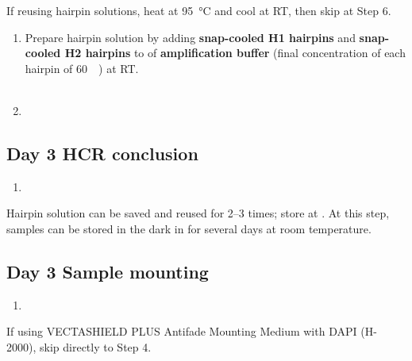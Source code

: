 \documentclass[10pt]{report}
\begin{document}
\bigskip\alert{If reusing hairpin solutions, heat at \qty{95}{\degreeCelsius} and cool at RT, then skip at Step 6.}

\begin{enumerate}[resume = steps]
	\item Prepare hairpin solution by adding \textbf{snap-cooled H1 hairpins} and \textbf{snap-cooled H2 hairpins} to \twohunmicrol{} of \textbf{amplification buffer} (final concentration of each hairpin of \qty{60}{\nano\molar}) at RT.\\
	      \\
	\item {}
\end{enumerate}

\subsection*{Day 3 \textendash{} HCR conclusion}

\begin{enumerate}[series = steps]
	\item {}
\end{enumerate}

\bigskip\alert{Hairpin solution can be saved and reused for 2--3 times; store at \minustwenty.}
\alert{At this step, samples can be stored in the dark in \ssct for several days at room temperature.}

\subsection*{Day 3 \textendash{} Sample mounting}

\begin{enumerate}[series = steps]
	\item {}
\end{enumerate}

\bigskip\alert{If using VECTASHIELD\textregistered{} PLUS Antifade Mounting Medium with DAPI (H-2000), skip directly to Step 4.}
\end{document}
